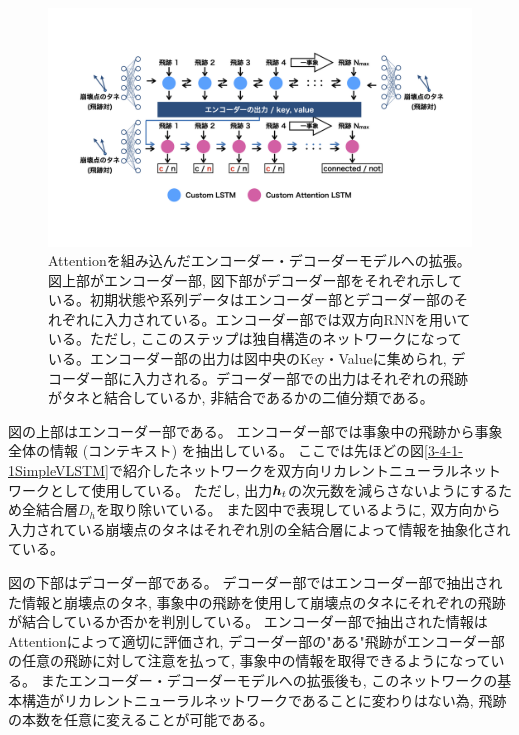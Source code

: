 \begin{figure}[htbp]
 \centering
 \includegraphics[trim = 100 200 100 100, width=1.0\textwidth, clip]{Figure/3Networks/3-4-1-4EncoderDecoderVLSTM.png}
 \caption[Attentionを組み込んだエンコーダー・デコーダーモデルへの拡張]{Attentionを組み込んだエンコーダー・デコーダーモデルへの拡張。図上部がエンコーダー部, 図下部がデコーダー部をそれぞれ示している。初期状態や系列データはエンコーダー部とデコーダー部のそれぞれに入力されている。エンコーダー部では双方向RNNを用いている。ただし, ここのステップは独自構造のネットワークになっている。エンコーダー部の出力は図中央のKey・Valueに集められ, デコーダー部に入力される。デコーダー部での出力はそれぞれの飛跡がタネと結合しているか, 非結合であるかの二値分類である。}
 \label{3-4-1-4EncoderDecoderVLSTM}
\end{figure}

図の上部はエンコーダー部である。
エンコーダー部では事象中の飛跡から事象全体の情報 (コンテキスト) を抽出している。
ここでは先ほどの図\ref{3-4-1-1SimpleVLSTM}で紹介したネットワークを双方向リカレントニューラルネットワークとして使用している。
ただし, 出力${\mbox{\boldmath{$h$}}}_{t}$の次元数を減らさないようにするため全結合層$D_h$を取り除いている。
また図中で表現しているように, 双方向から入力されている崩壊点のタネはそれぞれ別の全結合層によって情報を抽象化されている。

図の下部はデコーダー部である。
デコーダー部ではエンコーダー部で抽出された情報と崩壊点のタネ, 事象中の飛跡を使用して崩壊点のタネにそれぞれの飛跡が結合しているか否かを判別している。
エンコーダー部で抽出された情報はAttentionによって適切に評価され, デコーダー部の"ある"飛跡がエンコーダー部の任意の飛跡に対して注意を払って, 事象中の情報を取得できるようになっている。
またエンコーダー・デコーダーモデルへの拡張後も, このネットワークの基本構造がリカレントニューラルネットワークであることに変わりはない為, 飛跡の本数を任意に変えることが可能である。

